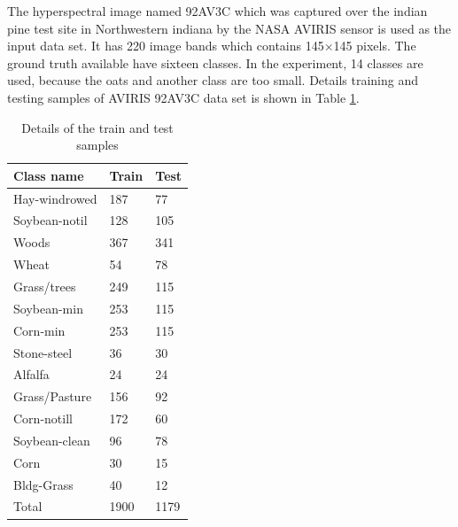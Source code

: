 \documentclass[document.tex]{subfiles}
\begin{document}
The hyperspectral image named 92AV3C which was captured over the indian pine test site in Northwestern indiana by the NASA AVIRIS sensor\cite{30} is used as the input data set. It has 220 image bands which contains 145$\times$145 pixels. The ground truth available have sixteen classes. In the experiment, 14 classes are used, because the oats and another class are too small. Details training and testing samples of AVIRIS 92AV3C data set is shown in Table \ref{tab:Details of the train and test samples}.
\begin{table}[H]
	\caption{Details of the train and test samples}
	\begin{center}
		\begin{tabular}{|l|l|l|}
			\hline
			Class name & Train & Test\\ \hline
			Hay-windrowed & 187 & 77\\ \hline
			Soybean-notil & 128 & 105\\ \hline
			Woods & 367 & 341\\ \hline
			Wheat & 54 & 78\\ \hline
			Grass/trees & 249 & 115\\ \hline
			Soybean-min & 253 & 115\\ \hline
			Corn-min & 253 & 115\\ \hline
			Stone-steel & 36 & 30\\ \hline
			Alfalfa & 24 & 24\\ \hline
			Grass/Pasture & 156 & 92\\ \hline
			Corn-notill & 172 & 60\\ \hline
			Soybean-clean & 96 & 78\\ \hline
			Corn & 30 & 15\\ \hline
			Bldg-Grass & 40 & 12\\ \hline
			Total & 1900 & 1179\\ \hline
		\end{tabular}
	\end{center}
	\label{tab:Details of the train and test samples}
\end{table}
\end{document}
